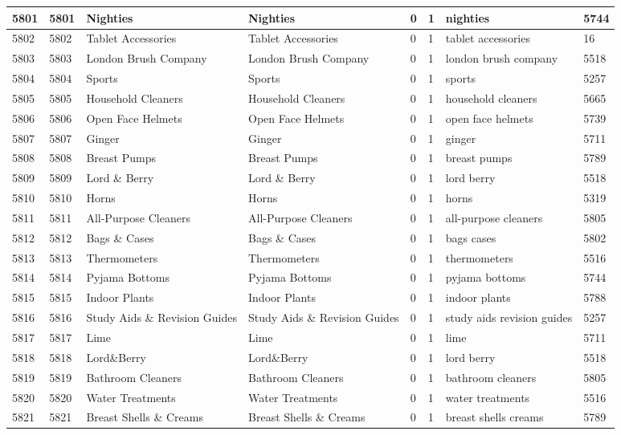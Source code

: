 \begin{longtable}{|l|l|l|l|l|l|l|l|}
5801 & 5801 & Nighties & Nighties & 0 & 1 & nighties & 5744 \\ \hline 
5802 & 5802 & Tablet Accessories & Tablet Accessories & 0 & 1 & tablet accessories & 16 \\ \hline 
5803 & 5803 & London Brush Company & London Brush Company & 0 & 1 & london brush company & 5518 \\ \hline 
5804 & 5804 & Sports & Sports & 0 & 1 & sports & 5257 \\ \hline 
5805 & 5805 & Household Cleaners & Household Cleaners & 0 & 1 & household cleaners & 5665 \\ \hline 
5806 & 5806 & Open Face Helmets & Open Face Helmets & 0 & 1 & open face helmets & 5739 \\ \hline 
5807 & 5807 & Ginger & Ginger & 0 & 1 & ginger & 5711 \\ \hline 
5808 & 5808 & Breast Pumps & Breast Pumps & 0 & 1 & breast pumps & 5789 \\ \hline 
5809 & 5809 & Lord \& Berry & Lord \& Berry & 0 & 1 & lord berry & 5518 \\ \hline 
5810 & 5810 & Horns & Horns & 0 & 1 & horns & 5319 \\ \hline 
5811 & 5811 & All-Purpose Cleaners & All-Purpose Cleaners & 0 & 1 & all-purpose cleaners & 5805 \\ \hline 
5812 & 5812 & Bags \& Cases & Bags \& Cases & 0 & 1 & bags cases & 5802 \\ \hline 
5813 & 5813 & Thermometers & Thermometers & 0 & 1 & thermometers & 5516 \\ \hline 
5814 & 5814 & Pyjama Bottoms & Pyjama Bottoms & 0 & 1 & pyjama bottoms & 5744 \\ \hline 
5815 & 5815 & Indoor Plants & Indoor Plants & 0 & 1 & indoor plants & 5788 \\ \hline 
5816 & 5816 & Study Aids \& Revision Guides & Study Aids \& Revision Guides & 0 & 1 & study aids revision guides & 5257 \\ \hline 
5817 & 5817 & Lime & Lime & 0 & 1 & lime & 5711 \\ \hline 
5818 & 5818 & Lord\&Berry & Lord\&Berry & 0 & 1 & lord berry & 5518 \\ \hline 
5819 & 5819 & Bathroom Cleaners & Bathroom Cleaners & 0 & 1 & bathroom cleaners & 5805 \\ \hline 
5820 & 5820 & Water Treatments & Water Treatments & 0 & 1 & water treatments & 5516 \\ \hline 
5821 & 5821 & Breast Shells \& Creams & Breast Shells \& Creams & 0 & 1 & breast shells creams & 5789 \\ \hline 

\end{longtable}

